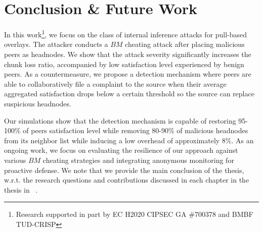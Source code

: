 \section{Conclusion \& Future Work}
\label{online-conclusion}
In this work\footnote{Research supported in part by EC H2020 CIPSEC GA \#700378 and BMBF TUD-CRISP}, we focus on the class of internal inference attacks for pull-based overlays. The attacker conducts a $BM$ cheating attack after placing malicious peers as headnodes.
We show that the attack severity significantly increases the chunk loss ratio, accompanied by low satisfaction level experienced by benign peers.
As a countermeasure, we propose a detection mechanism where peers are able to collaboratively file a complaint to the source when their average aggregated satisfaction drops below a certain threshold so the source can replace suspicious headnodes.

Our simulations show that the detection mechanism is capable of restoring 95-100\% of peers satisfaction level while removing 80-90\% of malicious headnodes from its neighbor list while inducing a low overhead of approximately 8\%.
As an ongoing work, we focus on evaluating the resilience of our approach against various $BM$ cheating strategies and integrating anonymous monitoring for proactive defense.
We note that we provide the main conclusion of the thesis, w.r.t. the research questions and contributions discussed in each chapter in the thesis in ~.